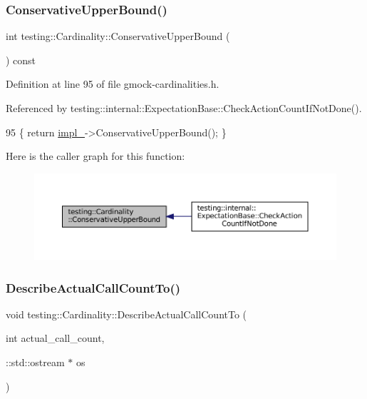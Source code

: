 \subsubsection{\texorpdfstring{Conservative\+Upper\+Bound()}{ConservativeUpperBound()}}
{\footnotesize\ttfamily int testing\+::\+Cardinality\+::\+Conservative\+Upper\+Bound (\begin{DoxyParamCaption}{ }\end{DoxyParamCaption}) const\hspace{0.3cm}{\ttfamily [inline]}}



Definition at line 95 of file gmock-\/cardinalities.\+h.



Referenced by testing\+::internal\+::\+Expectation\+Base\+::\+Check\+Action\+Count\+If\+Not\+Done().


\begin{DoxyCode}
95 \{ \textcolor{keywordflow}{return} \hyperlink{classtesting_1_1Cardinality_ae8c43c635af16756d535b491ccf19c2f}{impl\_}->ConservativeUpperBound(); \}
\end{DoxyCode}
Here is the caller graph for this function\+:
\nopagebreak
\begin{figure}[H]
\begin{center}
\leavevmode
\includegraphics[width=350pt]{classtesting_1_1Cardinality_acb42e3683f99b986f3ac538b5eefbc31_icgraph}
\end{center}
\end{figure}
\mbox{\label{classtesting_1_1Cardinality_a7cbea339e2f3072a98367e087aa296e8}} 
\subsubsection{\texorpdfstring{Describe\+Actual\+Call\+Count\+To()}{DescribeActualCallCountTo()}}
{\footnotesize\ttfamily void testing\+::\+Cardinality\+::\+Describe\+Actual\+Call\+Count\+To (\begin{DoxyParamCaption}\item[{int}]{actual\+\_\+call\+\_\+count,  }\item[{\+::std\+::ostream $\ast$}]{os }\end{DoxyParamCaption})\hspace{0.3cm}{\ttfamily [static]}}




